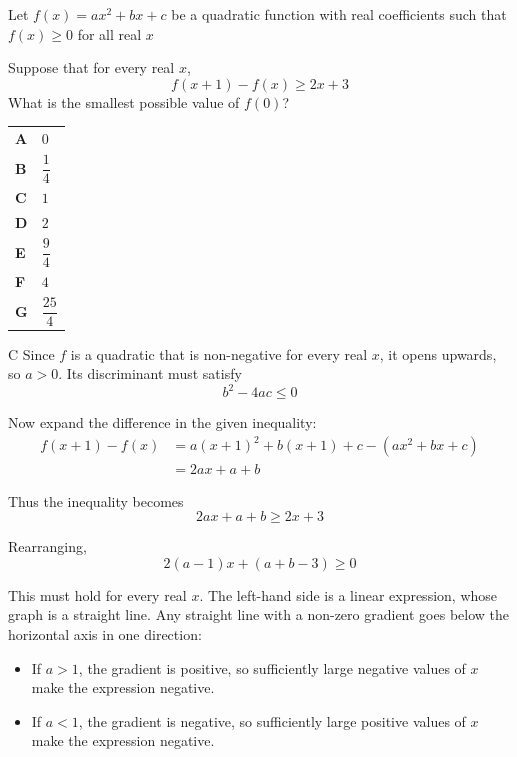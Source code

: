 \documentclass[11pt,a4paper]{article}
\begin{document}
\begin{enumerate}[label=\textbf{\arabic*.},leftmargin=*,itemsep=0pt,start=20]
\questionitem[Inequalities]
Let $f(x)=ax^2+bx+c$ be a quadratic function with real coefficients such that $f(x)\ge 0$ for all real $x$

Suppose that for every real $x$, \[ f(x+1)-f(x)\ge 2x+3 \] What is the smallest possible value of $f(0)$?

\par\vspace*{12pt}
\begin{tabularx}{\linewidth}{@{}>{\bfseries}l Y@{}}
A &
$0$
\\[0.8em]
B &
$\dfrac{1}{4}$
\\[0.8em]
C &
$1$
\\[0.8em]
D &
$2$
\\[0.8em]
E &
$\dfrac{9}{4}$
\\[0.8em]
F &
$4$
\\[0.8em]
G &
$\dfrac{25}{4}$
\\
\end{tabularx}

\begin{djsSolution}{C}
Since $f$ is a quadratic that is non-negative for every real $x$, it opens upwards, so $a>0$. Its discriminant must satisfy
\[
b^2-4ac\leq0
\]

Now expand the difference in the given inequality:
\[
\begin{aligned}
f(x+1)-f(x)
&=a(x+1)^2+b(x+1)+c-(ax^2+bx+c)\\
&=2ax+a+b
\end{aligned}
\]

Thus the inequality becomes
\[
2ax+a+b\geq2x+3
\]

Rearranging,
\[
2(a-1)x+(a+b-3)\geq0
\]

This must hold for every real $x$. The left-hand side is a linear expression, whose graph is a straight line. Any straight line with a non-zero gradient goes below the horizontal axis in one direction:
\begin{itemize}
\item If $a>1$, the gradient is positive, so sufficiently large negative values of $x$ make the expression negative.
\item If $a<1$, the gradient is negative, so sufficiently large positive values of $x$ make the expression negative.
\end{itemize}


\end{djsSolution}
\end{enumerate}
\end{document}
